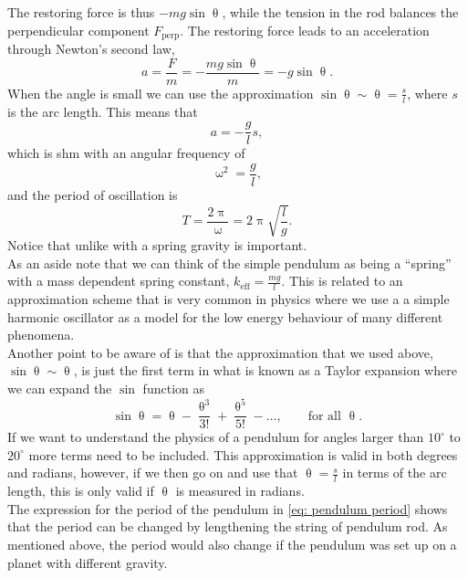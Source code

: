 The restoring force is thus $-mg\sin\uptheta$, while the tension in the rod balances the perpendicular component $F_{\text{perp}}$.  The restoring force leads to an acceleration through Newton's second law,
\begin{equation*}
a=\frac{F}{m}=-\frac{mg\sin\uptheta}{m}=-g\sin\uptheta.
\end{equation*}
When the angle is small we can use the approximation $\sin\uptheta\sim\uptheta=\frac{s}{l}$, where $s$ is the arc length. This means that
\begin{equation*}
a=-\frac{g}{l}s,
\end{equation*}
which is shm with an angular frequency of 
\begin{equation}
\upomega^{2}=\frac{g}{l},
\label{eq: pendulum frequency}
\end{equation}
and the period of oscillation is
\begin{equation}
T=\frac{2\uppi}{\upomega}=2\uppi\sqrt{\frac{l}{g}}.
\label{eq: pendulum period}
\end{equation}
Notice that unlike with a spring gravity is important.\\

As an aside note that we can think of the simple pendulum as being a ``spring'' with a mass dependent spring constant, $k_{\text{eff}}=\frac{mg}{l}$. This is related to an approximation scheme that is very common in physics where we use a a simple harmonic oscillator as a model for the low energy behaviour of many different phenomena.\\

Another point to be aware of is that the approximation that we used above, $\sin\uptheta\sim\uptheta$, is just the first term in what is known as a Taylor expansion where we can expand the $\sin$ function as
\begin{equation*}
\sin\uptheta=\uptheta-\frac{\uptheta^{3}}{3!}+\frac{\uptheta^{5}}{5!}-\dots, \qquad \text{for all } \uptheta.
\end{equation*}
If we want to understand the physics of a pendulum for angles larger than $10^{\circ}$ to $20^{\circ}$ more terms need to be included. This approximation is valid in both degrees and radians, however, if we then go on and use that $\uptheta=\frac{s}{l}$ in terms of the arc length, this is only valid if $\uptheta$ is measured in radians.\\

The expression for the period of the pendulum in \cref{eq: pendulum period} shows that the period can be changed by lengthening the string of pendulum rod. As mentioned above, the period would also change if the pendulum was set up on a planet with different gravity.\\

